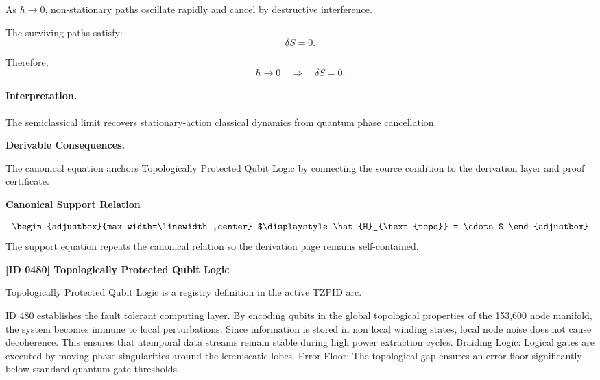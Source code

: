 As $\hbar\to 0$, non-stationary paths oscillate rapidly and cancel by destructive interference.

The surviving paths satisfy:
\begin{equation}
\delta S=0 .
\end{equation}

Therefore,
\begin{equation}
\boxed{
\hbar\rightarrow 0
\quad\Longrightarrow\quad
\delta S=0 .
}
\end{equation}

\paragraph{Interpretation.}
The semiclassical limit recovers stationary-action classical dynamics from quantum phase cancellation.

\par\vspace{0.35em}
\noindent\textbf{Derivable Consequences.}\quad
\begingroup
\footnotesize
\raggedright
The canonical equation anchors Topologically Protected Qubit Logic by connecting the source condition to the derivation layer and proof certificate.
\par\endgroup

\noindent\textbf{Canonical Support Relation}\par
\[
\begin{adjustbox}{max width=\linewidth,center}
$\displaystyle
\hat{H}_{\text{topo}} = \cdots
$
\end{adjustbox}
\]
\noindent The support equation repeats the canonical relation so the derivation page remains self-contained.\par

\clearpage
\noindent\textbf{[ID 0480] Topologically Protected Qubit Logic}\par
\vspace{0.35em}
\begingroup\small
{}
Topologically Protected Qubit Logic is a registry definition in the active TZPID arc.

ID 480 establishes the fault tolerant computing layer. By encoding qubits in the global topological properties of the 153,600 node manifold, the system becomes immune to local perturbations. Since information is stored in non local winding states, local node noise does not cause decoherence. This ensures that atemporal data streams remain stable during high power extraction cycles. Braiding Logic: Logical gates are executed by moving phase singularities around the lemniscatic lobes. Error Floor: The topological gap ensures an error floor significantly below standard quantum gate thresholds.

